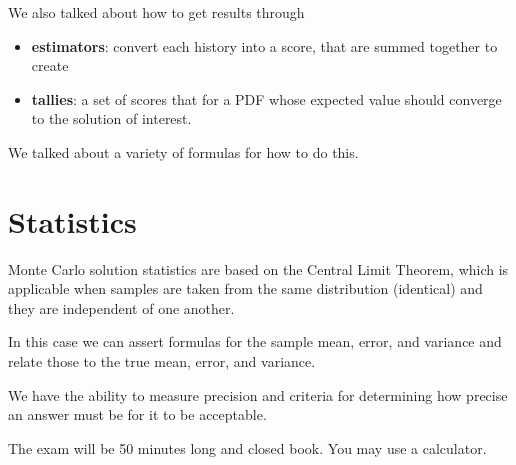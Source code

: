 \documentclass[12pt]{article}
\begin{document}
We also talked about how to get results through 
\begin{itemize}
\item \textbf{estimators}: convert each history into a score, that are summed together to create 
\item \textbf{tallies}: a set of scores that for a PDF whose expected value should converge to the solution of interest.
\end{itemize}

We talked about a variety of formulas for how to do this. 


\section{Statistics}

Monte Carlo solution statistics are based on the Central Limit Theorem, which is applicable when samples are taken from the same distribution (identical) and they are independent of one another. 

In this case we can assert formulas for the sample mean, error, and variance and relate those to the true mean, error, and variance. 

We have the ability to measure precision and criteria for determining how precise an answer must be for it to be acceptable. 

The exam will be 50 minutes long and closed book. You may use a calculator.
\end{document}
